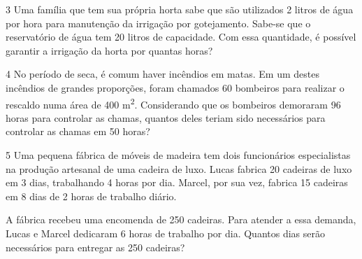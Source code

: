 \num{3} Uma família que tem sua própria horta sabe que são utilizados 2
litros de água por hora para manutenção da irrigação por gotejamento.
Sabe-se que o reservatório de água tem 20 litros de capacidade. Com essa
quantidade, é possível garantir a irrigação da horta por quantas horas?

\begin{emptybox}
\end{emptybox}

\num{4} No período de seca, é comum haver incêndios em matas. Em um destes
incêndios de grandes proporções, foram chamados 60 bombeiros para
realizar o rescaldo numa área de 400 m\textsuperscript{2}. Considerando 
que os bombeiros demoraram 96 horas para controlar as chamas, quantos 
deles teriam sido necessários para controlar as chamas em 50 horas?

\begin{emptybox}
\end{emptybox}

\num{5} Uma pequena fábrica de móveis de madeira tem dois funcionários
especialistas na produção artesanal de uma cadeira de luxo. Lucas
fabrica 20 cadeiras de luxo em 3 dias, trabalhando 4 horas por dia.
Marcel, por sua vez, fabrica 15 cadeiras em 8 dias de 2 horas
de trabalho diário.
\enlargethispage{2\baselineskip}

A fábrica recebeu uma encomenda de 250 cadeiras. Para atender a essa demanda,
Lucas e Marcel dedicaram 6 horas de trabalho por dia. Quantos dias serão
necessários para entregar as 250 cadeiras?

\begin{emptybox}
\end{emptybox}

